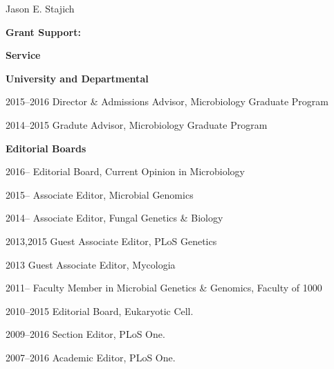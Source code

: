 \documentclass[10pt]{article}
\begin{document}
\begin{cv}{\centerline{Jason E. Stajich}}
\begin{cvlistcompact}{\bf Grant Support:}
\begin{cvlistcompact}{\bf Service}
\item[{\bf University and Departmental}]
\item [2015--2016] Director \& Admissions Advisor, Microbiology Graduate Program
\item [2014--2015] Gradute Advisor, Microbiology Graduate Program
  \\  
\item[{\bf Editorial Boards}]
\item [2016--] Editorial Board, Current Opinion in Microbiology
\item [2015--] Associate Editor, Microbial Genomics
\item [2014--] Associate Editor, Fungal Genetics \& Biology
\item [2013,2015] Guest Associate Editor, PLoS Genetics
\item [2013] Guest Associate Editor, Mycologia
\item [2011--] Faculty Member in Microbial Genetics \& Genomics,
  Faculty of 1000
\item [2010--2015] Editorial Board, Eukaryotic Cell.
\item [2009--2016] Section Editor, PLoS One.
\item [2007--2016] Academic Editor, PLoS One.
\\
  

\end{cvlistcompact}
\end{cvlistcompact}
\end{cv}
\end{document}
